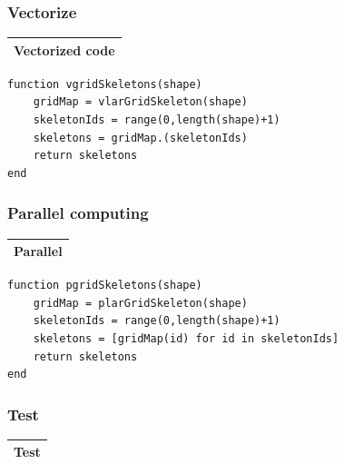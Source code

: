 \documentclass{article}
\begin{document}
\begin{flushleft}
\subsubsection{Vectorize}
\vspace{1ex}
\begin{center}
\begin{tabular}{|p{16cm}|}
\hline
\cellcolor[gray]{.9}Vectorized code\\
\hline
\end{tabular}
\end{center}
\begin{list}{}{} \item
   \begin{Verbatim}[tabsize=4]
function vgridSkeletons(shape)
    gridMap = vlarGridSkeleton(shape)
    skeletonIds = range(0,length(shape)+1)
    skeletons = gridMap.(skeletonIds)
    return skeletons
end
   \end{Verbatim}
\end{list}

\vspace{2ex}

\subsubsection{Parallel computing}
\vspace{1ex}
\begin{center}
\begin{tabular}{|p{16cm}|}
\hline
\cellcolor[gray]{.9}Parallel\\
\hline
\end{tabular}
\end{center}
\begin{list}{}{} \item
   \begin{Verbatim}[tabsize=4]
function pgridSkeletons(shape)
    gridMap = plarGridSkeleton(shape)
    skeletonIds = range(0,length(shape)+1)
    skeletons = [gridMap(id) for id in skeletonIds]
    return skeletons
end
   \end{Verbatim}
\end{list}

\vspace{-1ex}
\footnotesize\addtolength{\baselineskip}{-1ex}
\end{flushleft}

\subsubsection{Test}
\begin{center}
\begin{tabular}{|p{16cm}|}
\hline
\cellcolor[gray]{.9}Test\\
\hline
\end{tabular}
\end{center}
\end{document}
